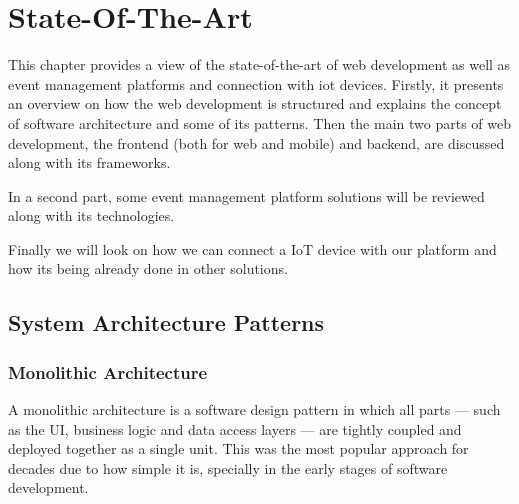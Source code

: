 
%

\chapter{State-Of-The-Art}
\label{cha:State-Of-The-Art}

This chapter provides a view of the state-of-the-art of web development as well
as event management platforms and connection with iot devices.
Firstly, it presents an overview on how the web development is structured and
explains the concept of software architecture and some of its patterns. Then the
main two parts of web development, the frontend (both for web and mobile) and
backend, are discussed along with its frameworks.

In a second part, some event management platform solutions will be reviewed
along with its technologies.

Finally we will look on how we can connect a IoT device with our platform and
how its being already done in other solutions.

\section{System Architecture Patterns}

\subsection{Monolithic Architecture}
A monolithic architecture is a software design pattern in which all parts ---
such as the \gls{UI}, business logic and data access layers --- are tightly
coupled and deployed together as a single unit\cite{7436659,10031648}. This
was the most popular approach for decades due to how simple it is, specially in
the early stages of software development\cite{Garlan2018}.

